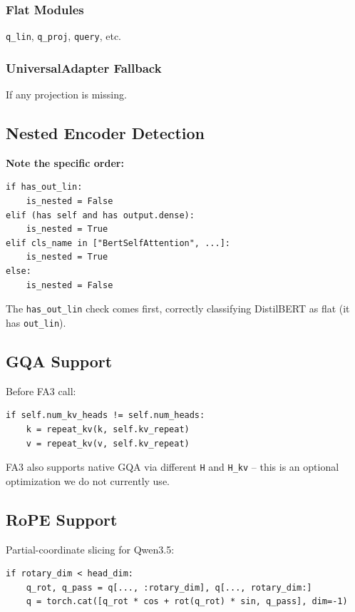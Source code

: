 \subsubsection{Flat Modules}

\texttt{q\_lin}, \texttt{q\_proj}, \texttt{query}, etc.

\subsubsection{UniversalAdapter Fallback}

If any projection is missing.

\subsection{Nested Encoder Detection}

\textbf{Note the specific order:}

\begin{lstlisting}
if has_out_lin:
    is_nested = False
elif (has self and has output.dense):
    is_nested = True
elif cls_name in ["BertSelfAttention", ...]:
    is_nested = True
else:
    is_nested = False
\end{lstlisting}

The \texttt{has\_out\_lin} check comes first, correctly classifying DistilBERT as 
flat (it has \texttt{out\_lin}).

\subsection{GQA Support}

Before FA3 call:

\begin{lstlisting}
if self.num_kv_heads != self.num_heads:
    k = repeat_kv(k, self.kv_repeat)
    v = repeat_kv(v, self.kv_repeat)
\end{lstlisting}

FA3 also supports native GQA via different \texttt{H} and \texttt{H\_kv} -- this is an 
optional optimization we do not currently use.

\subsection{RoPE Support}

Partial-coordinate slicing for Qwen3.5:

\begin{lstlisting}
if rotary_dim < head_dim:
    q_rot, q_pass = q[..., :rotary_dim], q[..., rotary_dim:]
    q = torch.cat([q_rot * cos + rot(q_rot) * sin, q_pass], dim=-1)
\end{lstlisting}


